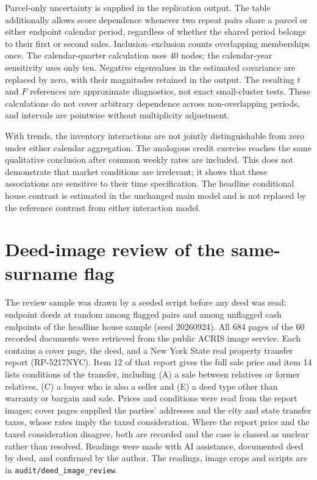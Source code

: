 \documentclass[12pt]{article}
\begin{document}


Parcel-only uncertainty is supplied in the replication output. The table additionally allows score dependence whenever two repeat pairs share a parcel or either endpoint calendar period, regardless of whether the shared period belongs to their first or second sales. Inclusion--exclusion counts overlapping memberships once. The calendar-quarter calculation uses 40 nodes; the calendar-year sensitivity uses only ten. Negative eigenvalues in the estimated covariance are replaced by zero, with their magnitudes retained in the output. The resulting $t$ and $F$ references are approximate diagnostics, not exact small-cluster tests. These calculations do not cover arbitrary dependence across non-overlapping periods, and intervals are pointwise without multiplicity adjustment.

With trends, the inventory interactions are not jointly distinguishable from zero under either calendar aggregation. The analogous credit exercise reaches the same qualitative conclusion after common weekly rates are included. This does not demonstrate that market conditions are irrelevant; it shows that these associations are sensitive to their time specification. The headline conditional house contrast is estimated in the unchanged main model and is not replaced by the reference contrast from either interaction model.


\section{Deed-image review of the same-surname flag}\label{sec:deedreview}
The review sample was drawn by a seeded script before any deed was read: \DeedN{} endpoint deeds at random among flagged pairs and \DeedUN{} among unflagged cash endpoints of the headline house sample (seed 20260924). All 684 pages of the 60 recorded documents were retrieved from the public ACRIS image service. Each contains a cover page, the deed, and a New York State real property transfer report (RP-5217NYC). Item 12 of that report gives the full sale price and item 14 lists conditions of the transfer, including (A) a sale between relatives or former relatives, (C) a buyer who is also a seller and (E) a deed type other than warranty or bargain and sale. Prices and conditions were read from the report images; cover pages supplied the parties' addresses and the city and state transfer taxes, whose rates imply the taxed consideration. Where the report price and the taxed consideration disagree, both are recorded and the case is classed as unclear rather than resolved. Readings were made with AI assistance, documented deed by deed, and confirmed by the author. The readings, image crops and scripts are in \texttt{audit/deed\_image\_review}.
\end{document}
